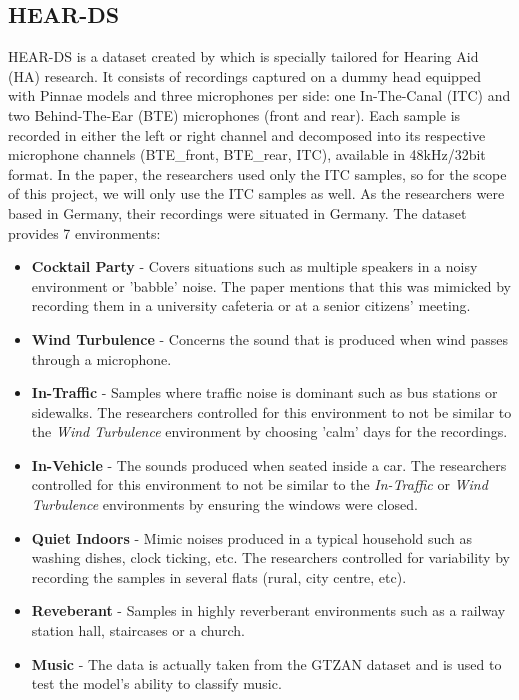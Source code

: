 \documentclass[logo,bsc,singlespacing,parskip,online]{infthesis}
\begin{document}
\subsection{HEAR-DS}
HEAR-DS is a dataset created by \citet{Huwel2020HearDS} which is specially tailored for Hearing Aid (HA) research. 
It consists of recordings captured on a dummy head equipped with Pinnae models and three microphones per side: one In-The-Canal (ITC) and two Behind-The-Ear (BTE) microphones (front and rear).
Each sample is recorded in either the left or right channel and decomposed into its respective microphone channels (BTE\_front, BTE\_rear, ITC), available in 48kHz/32bit format.
In the paper, the researchers used only the ITC samples, so for the scope of this project, we will only use the ITC samples as well. 
As the researchers were based in Germany, their recordings were situated in Germany.
The dataset provides 7 environments:
\begin{itemize}
   \item \textbf{Cocktail Party} - Covers situations such as multiple speakers in a noisy environment or 'babble' noise. The paper mentions that this was mimicked by recording them in a university cafeteria or at a senior citizens' meeting.
   \item \textbf{Wind Turbulence} - Concerns the sound that is produced when wind passes through a microphone.
   \item \textbf{In-Traffic} - Samples where traffic noise is dominant such as bus stations or sidewalks. The researchers controlled for this environment to not be similar to the \textit{Wind Turbulence} environment by choosing 'calm' days for the recordings.
   \item \textbf{In-Vehicle} - The sounds produced when seated inside a car. The researchers controlled for this environment to not be similar to the \textit{In-Traffic} or \textit{Wind Turbulence} environments by ensuring the windows were closed. 
   \item \textbf{Quiet Indoors} - Mimic noises produced in a typical household such as washing dishes, clock ticking, etc. The researchers controlled for variability by recording the samples in several flats (rural, city centre, etc).
   \item \textbf{Reveberant} - Samples in highly reverberant environments such as a railway station hall, staircases or a church. 
   \item \textbf{Music} - The data is actually taken from the GTZAN dataset \cite{tzanetakis_musical_2002} and is used to test the model's ability to classify music.
\end{itemize}
\end{document}
